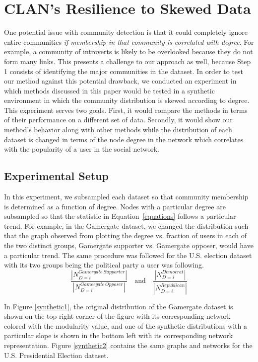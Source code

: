 \section{CLAN's Resilience to Skewed Data}
One potential issue with community detection is that it could completely ignore entire communities \emph{if membership in that community is correlated with degree}. For example, a community of introverts is likely to be overlooked because they do not form many links. This presents a challenge to our approach as well, because Step 1 consists of identifying the major communities in the dataset. 
In order to test our method against this potential drawback, we conducted an experiment in which methods discussed in this paper would be tested in a synthetic environment in which the community distribution is skewed according to degree. This experiment serves two goals. First, it would compare the methods in terms of their performance on a different set of data. Secondly, it would show our method's behavior along with other methods while the distribution of each dataset is changed in terms of the node degree in the network which correlates with the popularity of a user in the social network.
\subsection{Experimental Setup}
In this experiment, we subsampled each dataset so that community membership is determined as a function of degree. Nodes with a particular degree are subsampled so that the statistic in Equation~\ref{equations} follows a particular trend. 
For example, in the Gamergate dataset, we changed the distribution such that the graph observed from plotting the degree vs. fraction of users in each of the two distinct groups, Gamergate supporter vs. Gamergate opposer, would have a particular trend. The same procedure was followed for the U.S. election dataset with its two groups being the political party a user was following. 
\begin{equation}
    \frac {\left|N_{D=i}^{Gamergate \, Supporter}\right|} {\left|N_{D=i}^{Gamergate \, Opposer}\right|}  \quad \textrm{and} \quad    \frac {\left|N_{D=i}^{Democrat}\right|} {\left|N_{D=i}^{Republican}\right|}
    \label{equations}
\end{equation} 

In Figure \ref{synthetic1}, the original distribution of the Gamergate dataset is shown on the top right corner of the figure with its corresponding network colored with the modularity value, and one of the synthetic distributions with a particular slope is shown in the bottom left with its corresponding network representation. Figure \ref{synthetic2} contains the same graphs and networks for the U.S. Presidential Election dataset. 


